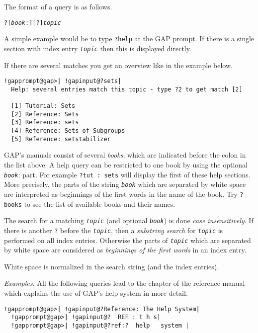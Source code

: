 \documentclass[a4paper,11pt]{report}
\begin{document}
{{ The format of a query is as follows. 

 \texttt{?[\mbox{\texttt{\mdseries\slshape book}}:][?]\mbox{\texttt{\mdseries\slshape topic}}} 

 A simple example would be to type \texttt{?help} at the \textsf{GAP} prompt. If there is a single section with index entry \mbox{\texttt{\mdseries\slshape topic}} then this is displayed directly. 

 If there are several matches you get an overview like in the example below. 

 
\begin{Verbatim}[commandchars=!@|,fontsize=\small,frame=single,label=Example]
  !gapprompt@gap>| !gapinput@?sets|
  Help: several entries match this topic - type ?2 to get match [2]
  
  [1] Tutorial: Sets
  [2] Reference: Sets
  [3] Reference: sets
  [4] Reference: Sets of Subgroups
  [5] Reference: setstabilizer
\end{Verbatim}
 

 \textsf{GAP}'s manuals consist of several \emph{books}, which are indicated before the colon in the list above. A help query can be
restricted to one book by using the optional \mbox{\texttt{\mdseries\slshape book}}: part. For example \texttt{?tut : sets} will display the first of these help sections. More precisely, the parts of
the string \mbox{\texttt{\mdseries\slshape book}} which are separated by white space are interpreted as beginnings of the first
words in the name of the book. Try \texttt{?books} to see the list of available books and their names. 

 The search for a matching \mbox{\texttt{\mdseries\slshape topic}} (and optional \mbox{\texttt{\mdseries\slshape book}}) is done \emph{case insensitively}. If there is another \texttt{?} before the \mbox{\texttt{\mdseries\slshape topic}}, then a \emph{substring search} for \mbox{\texttt{\mdseries\slshape topic}} is performed on all index entries. Otherwise the parts of \mbox{\texttt{\mdseries\slshape topic}} which are separated by white space are considered as \emph{beginnings of the first words} in an index entry. 

 White space is normalized in the search string (and the index entries). 

 \emph{Examples.} All the following queries lead to the chapter of the reference manual which
explains the use of \textsf{GAP}'s help system in more detail. 

 
\begin{Verbatim}[commandchars=!@|,fontsize=\small,frame=single,label=Example]
  !gapprompt@gap>| !gapinput@?Reference: The Help System|
  !gapprompt@gap>| !gapinput@?  REF : t h s|
  !gapprompt@gap>| !gapinput@?ref:?  help   system |
\end{Verbatim}
 

}}
\end{document}
